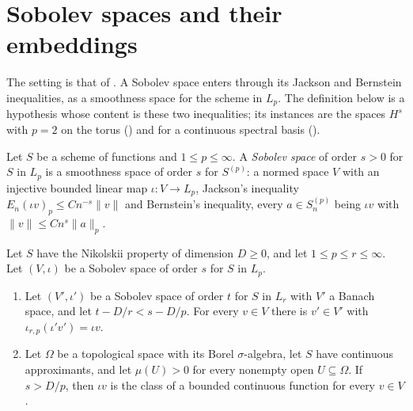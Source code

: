 \chapter{Sobolev spaces and their embeddings}
\label{ch:sobolev}

The setting is that of . A Sobolev space enters through its Jackson and
Bernstein inequalities, as a smoothness space for the scheme in $L_p$. The definition below is a
hypothesis whose content is these two inequalities; its instances are the spaces $H^s$ with
$p = 2$ on the torus () and for a continuous spectral basis
().

\begin{definition}
\label{def:sobolev-scheme}
\leanok
{}
Let $S$ be a scheme of functions and $1 \leq p \leq \infty$. A \emph{Sobolev space} of order
$s > 0$ for $S$ in $L_p$ is a smoothness space of order $s$ for $S^{(p)}$: a normed space $V$
with an injective bounded linear map $\iota : V \to L_p$, Jackson's inequality
$E_n(\iota v)_p \leq C n^{-s} \|v\|$ and Bernstein's inequality, every $a \in S^{(p)}_n$ being
$\iota v$ with $\|v\| \leq C n^s \|a\|_p$.
\end{definition}

\begin{theorem}
\label{thm:sobolev-embedding}
\leanok
{}
Let $S$ have the Nikolskii property of dimension $D \geq 0$, and let $1 \leq p \leq r \leq
\infty$. Let $(V, \iota)$ be a Sobolev space of order $s$ for $S$ in $L_p$.
\begin{enumerate}
  \item Let $(V', \iota')$ be a Sobolev space of order $t$ for $S$ in $L_r$ with $V'$ a Banach
    space, and let $t - D/r < s - D/p$. For every $v \in V$ there is $v' \in V'$ with
    $\iota_{r,p}(\iota' v') = \iota v$.
  \item Let $\Omega$ be a topological space with its Borel $\sigma$-algebra, let $S$ have
    continuous approximants, and let $\mu(U) > 0$ for every nonempty open $U \subseteq \Omega$.
    If $s > D/p$, then $\iota v$ is the class of a bounded continuous function for every
    $v \in V$.
\end{enumerate}
\end{theorem}

